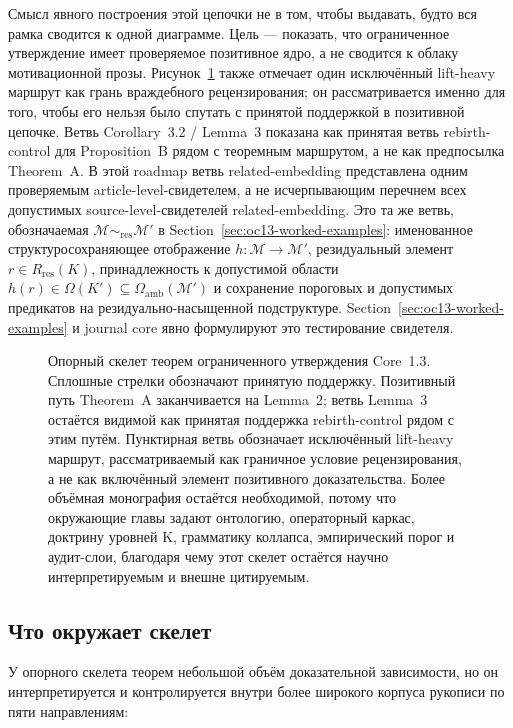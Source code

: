 Смысл явного построения этой цепочки не в том, чтобы выдавать, будто вся рамка сводится к одной диаграмме. Цель — показать, что ограниченное утверждение имеет проверяемое позитивное ядро, а не сводится к облаку мотивационной прозы. Рисунок~\ref{fig:oc13-theorem-spine} также отмечает один исключённый lift-heavy маршрут как грань враждебного рецензирования; он рассматривается именно для того, чтобы его нельзя было спутать с принятой поддержкой в позитивной цепочке. Ветвь Corollary~3.2 / Lemma~3 показана как принятая ветвь rebirth-control для Proposition~B рядом с теоремным маршрутом, а не как предпосылка Theorem~A. В этой roadmap ветвь related-embedding представлена одним проверяемым article-level-свидетелем, а не исчерпывающим перечнем всех допустимых source-level-свидетелей related-embedding. Это та же ветвь, обозначаемая \(\mathcal{M}\sim_{\mathrm{res}}\mathcal{M}'\) в Section~\ref{sec:oc13-worked-examples}: именованное структуросохраняющее отображение \(h:\mathcal{M}\to\mathcal{M}'\), резидуальный элемент \(r\in R_{\mathrm{res}}(K)\), принадлежность к допустимой области \(h(r)\in\Omega(K')\subseteq\Omega_{\mathrm{amb}}(\mathcal{M}')\) и сохранение пороговых и допустимых предикатов на резидуально-насыщенной подструктуре. Section~\ref{sec:oc13-worked-examples} и journal core явно формулируют это тестирование свидетеля.

\begin{figure}[htbp]
\centering

\caption{Опорный скелет теорем ограниченного утверждения Core~1.3. Сплошные стрелки обозначают принятую поддержку. Позитивный путь Theorem~A заканчивается на Lemma~2; ветвь Lemma~3 остаётся видимой как принятая поддержка rebirth-control рядом с этим путём. Пунктирная ветвь обозначает исключённый lift-heavy маршрут, рассматриваемый как граничное условие рецензирования, а не как включённый элемент позитивного доказательства. Более объёмная монография остаётся необходимой, потому что окружающие главы задают онтологию, операторный каркас, доктрину уровней K, грамматику коллапса, эмпирический порог и аудит-слои, благодаря чему этот скелет остаётся научно интерпретируемым и внешне цитируемым.}
\label{fig:oc13-theorem-spine}
\end{figure}

\subsection{Что окружает скелет}

У опорного скелета теорем небольшой объём доказательной зависимости, но он интерпретируется и контролируется внутри более широкого корпуса рукописи по пяти направлениям:

